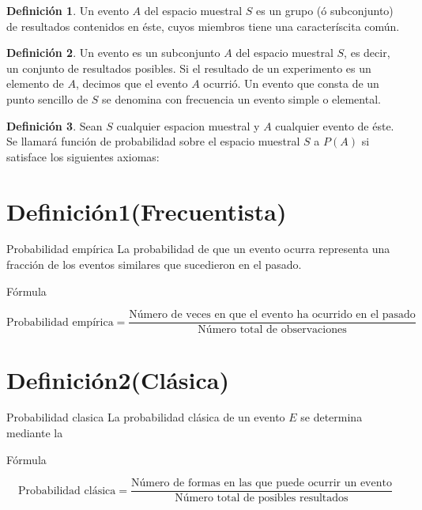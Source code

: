 \documentclass[
]{book}
\theoremstyle{definition}
\newtheorem{definition}{Definición}[chapter]
\theoremstyle{definition}
\theoremstyle{definition}
\theoremstyle{definition}
\theoremstyle{remark}
\begin{document}
\begin{definition}
\protect\hypertarget{def:unnamed-chunk-40}{}{\label{def:unnamed-chunk-40} }Un evento \(A\) del espacio muestral \(S\) es un grupo (ó subconjunto) de resultados contenidos en éste, cuyos miembros tiene una caracteríscita común.
\end{definition}

\begin{definition}
\protect\hypertarget{def:unnamed-chunk-41}{}{\label{def:unnamed-chunk-41} }Un evento es un subconjunto \(A\) del espacio muestral \(S\), es decir, un conjunto de resultados posibles. Si el resultado de un experimento es un elemento de \(A\), decimos que el evento \(A\) ocurrió. Un evento que consta de un punto sencillo de \(S\) se denomina con frecuencia un evento simple o elemental.
\end{definition}

\begin{definition}
\protect\hypertarget{def:unnamed-chunk-42}{}{\label{def:unnamed-chunk-42} }Sean \(S\) cualquier espacion muestral y \(A\) cualquier evento de éste. Se llamará función de probabilidad sobre el espacio muestral \(S\) a \(P(A)\) si satisface los siguientes axiomas:
\end{definition}

\hypertarget{definiciuxf3n1frecuentista}{%
\section{Definición1(Frecuentista)}\label{definiciuxf3n1frecuentista}}

Probabilidad empírica La probabilidad de que un evento ocurra representa una fracción de los eventos similares que sucedieron en el pasado.

Fórmula

\[
\text{Probabilidad empírica}=\dfrac{\text{Número de veces en que el evento ha ocurrido en el pasado}}{\text{Número total de observaciones}}
\]

\hypertarget{definiciuxf3n2cluxe1sica}{%
\section{Definición2(Clásica)}\label{definiciuxf3n2cluxe1sica}}

Probabilidad clasica La probabilidad clásica de un evento \(E\) se determina mediante la

Fórmula

\[
\text{Probabilidad clásica}=\dfrac{\text{Número de formas en las que puede ocurrir un evento}}{\text{Número total de posibles resultados}}
\]
\end{document}
